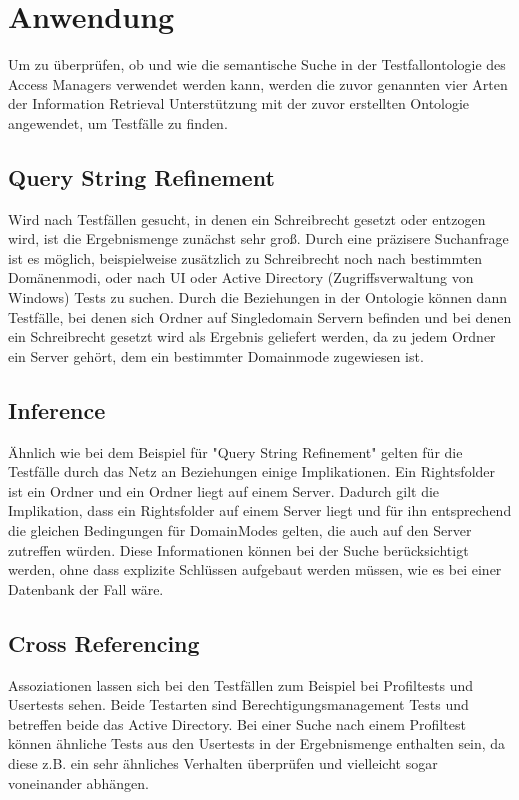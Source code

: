 \section{Anwendung}
Um zu überprüfen, ob und wie die semantische Suche in der Testfallontologie des Access Managers verwendet werden kann, werden die zuvor genannten vier Arten der \glqq Information Retrieval\grqq{} Unterstützung mit der zuvor erstellten Ontologie angewendet, um Testfälle zu finden.

\subsection*{Query String Refinement}
Wird nach Testfällen gesucht, in denen ein Schreibrecht gesetzt oder entzogen wird, ist die Ergebnismenge zunächst sehr groß. Durch eine präzisere Suchanfrage ist es möglich, beispielweise zusätzlich zu Schreibrecht noch nach bestimmten Domänenmodi, oder nach UI oder Active Directory (Zugriffsverwaltung von Windows) Tests zu suchen. Durch die Beziehungen in der Ontologie können dann Testfälle, bei denen sich Ordner auf Singledomain Servern befinden und bei denen ein Schreibrecht gesetzt wird als Ergebnis geliefert werden, da zu jedem Ordner ein Server gehört, dem ein bestimmter Domainmode zugewiesen ist.

\subsection*{Inference}
Ähnlich wie bei dem Beispiel für "Query String Refinement" gelten für die Testfälle durch das Netz an Beziehungen einige Implikationen. Ein Rightsfolder ist ein Ordner und ein Ordner liegt auf einem Server. Dadurch gilt die Implikation, dass ein Rightsfolder auf einem Server liegt und für ihn entsprechend die gleichen Bedingungen für DomainModes gelten, die auch auf den Server zutreffen würden. Diese Informationen können bei der Suche berücksichtigt werden, ohne dass explizite Schlüssen aufgebaut werden müssen, wie es bei einer Datenbank der Fall wäre. 

\subsection*{Cross Referencing}
Assoziationen lassen sich bei den Testfällen zum Beispiel bei Profiltests und Usertests sehen. Beide Testarten sind Berechtigungsmanagement Tests und betreffen beide das Active Directory. Bei einer Suche nach einem Profiltest können ähnliche Tests aus den Usertests in der Ergebnismenge enthalten sein, da diese z.B. ein sehr ähnliches Verhalten überprüfen und vielleicht sogar voneinander abhängen.

